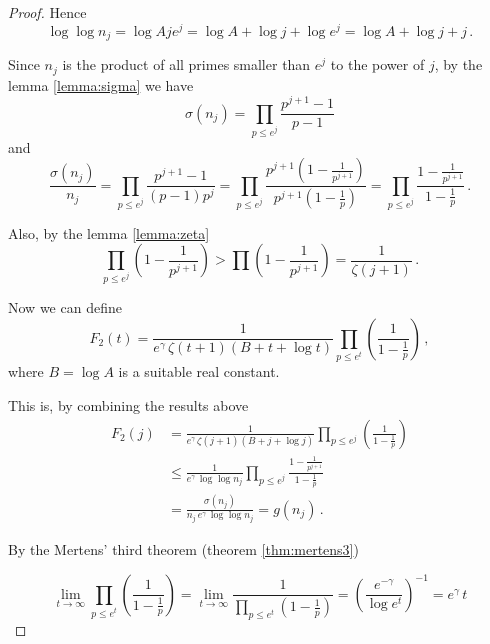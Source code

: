 \documentclass{article}
\begin{document}
\begin{theorem}
\begin{proof}
Hence
\begin{equation*}
\label{eq:lognj}
    \log \log n_j = \log Aje^j = \log A + \log j + \log e^j = \log A + \log j + j\,.
\end{equation*}

Since $n_j$ is the product of all primes smaller than $e^j$ to the power of $j$, by the lemma \ref{lemma:sigma} we have
\begin{equation*}
    \sigma(n_j) = \prod_{p\leq e^j} \frac{p^{j+1}-1}{p-1}
\end{equation*}
and
\begin{equation*}
    \frac{\sigma(n_j)}{n_j} = \prod_{p\leq e^j} \frac{p^{j+1}-1}{(p-1)p^j} = \prod_{p\leq e^j} \frac{p^{j+1}\left(1-\frac{1}{p^{j+1}}\right)}{p^{j+1}\left(1-\frac{1}{p}\right)} = \prod_{p\leq e^j} \frac{1-\frac{1}{p^{j+1}}}{1-\frac{1}{p}}\,.
\end{equation*}

Also, by the lemma \ref{lemma:zeta}
\begin{equation*}
    \prod_{p\leq e^j}\left(1-\frac{1}{p^{j+1}}\right) > \prod \left(1-\frac{1}{p^{j+1}}\right) = \frac{1}{\zeta(j+1)}\,.
\end{equation*}

Now we can define
\begin{equation*}
    F_2(t)=\frac{1}{e^\gamma\,\zeta(t+1)(B+t+\log t)} \prod_{p\leq e^t} \left(\frac{1}{1-\frac{1}{p}}\right)\,,
\end{equation*}
where $B=\log A$ is a suitable real constant.

This is, by combining the results above
\begin{align*}
    F_2(j)& = \frac{1}{e^\gamma\,\zeta(j+1)(B+j+\log j)} \prod_{p\leq e^j} \left(\frac{1}{1-\frac{1}{p}}\right)\\
    & \leq \frac{1}{e^\gamma\,\log \log n_j} \prod_{p\leq e^j} \frac{1-\frac{1}{p^{j+1}}}{1-\frac{1}{p}}\\
    & = \frac{\sigma(n_j)}{n_j\,e^\gamma\,\log \log n_j} = g(n_j)\,.
\end{align*}

By the Mertens' third theorem (theorem \ref{thm:mertens3})

\begin{equation*}
    \lim_{t \rightarrow \infty} \prod_{p\leq e^t} \left(\frac{1}{1-\frac{1}{p}}\right) = \lim_{t \rightarrow \infty} \frac{1}{\prod_{p\leq e^t} \left(1-\frac{1}{p}\right)} = \left(\frac{e^{-\gamma}}{\log e^t}\right)^{-1} = e^\gamma\,t
\end{equation*}


\end{proof}
\end{theorem}
\end{document}
